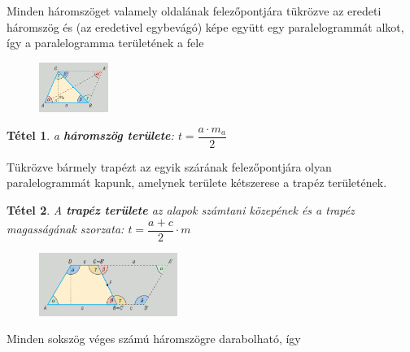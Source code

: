 \documentclass[12pt,a4paper]{article}
\newtheorem{theorem}{Tétel} [section]
\begin{document}
Minden háromszöget valamely oldalának felezőpontjára tükrözve az eredeti háromszög és (az eredetivel egybevágó) képe együtt egy paralelogrammát alkot, így a paralelogramma területének a fele

\begin{figure}[h]
\centering
\includegraphics[width=0.2\textwidth]{haromszog_terulete}
\end{figure}

\begin{theorem}
a \textbf{háromszög területe}: $t=\dfrac{a\cdot m_a}{2}$
\end{theorem}
Tükrözve bármely trapézt az egyik szárának felezőpontjára olyan paralelogrammát kapunk, amelynek területe kétszerese a trapéz területének.
\begin{theorem}
A \textbf{trapéz területe} az alapok számtani közepének és a trapéz magasságának szorzata: $t=\dfrac{a+c}{2}\cdot m$
\begin{figure}[h]
\centering
\includegraphics[width=0.4\textwidth]{trapez_terulete}
\end{figure}
\end{theorem}
\newpage
Minden sokszög véges számú háromszögre darabolható, így
\end{document}
